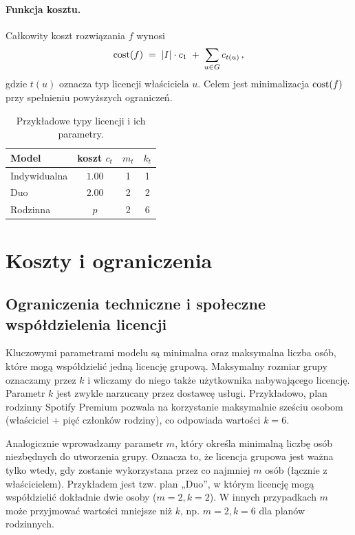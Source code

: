 \paragraph{Funkcja kosztu.}
Całkowity koszt rozwiązania $f$ wynosi
\[
  \operatorname{cost}(f)\;=\;|I|\cdot c_1\; +\; \sum_{u\in G} c_{t(u)}\, ,
\]
gdzie $t(u)$ oznacza typ licencji właściciela $u$. Celem jest minimalizacja $\operatorname{cost}(f)$ przy spełnieniu powyższych ograniczeń.

\begin{table}[h]
\centering
\begin{tabular}{@{}lccc@{}}
\toprule
Model & koszt $c_t$ & $m_t$ & $k_t$ \\
\midrule
Indywidualna & $1.00$ & 1 & 1 \\
Duo          & $2.00$ & 2 & 2 \\
Rodzinna     & $p$    & 2 & 6 \\
\bottomrule
\end{tabular}
\caption{Przykładowe typy licencji i ich parametry.}
\label{tab:license_models}
\end{table}


\section{Koszty i ograniczenia}

\subsection{Ograniczenia techniczne i społeczne współdzielenia licencji}

Kluczowymi parametrami modelu są minimalna oraz maksymalna liczba osób, które mogą współdzielić jedną licencję grupową. Maksymalny rozmiar grupy oznaczamy przez $k$ i wliczamy do niego także użytkownika nabywającego licencję. Parametr $k$ jest zwykle narzucany przez dostawcę usługi. Przykładowo, plan rodzinny Spotify Premium pozwala na korzystanie maksymalnie sześciu osobom (właściciel + pięć członków rodziny), co odpowiada wartości $k=6$.

Analogicznie wprowadzamy parametr $m$, który określa minimalną liczbę osób niezbędnych do utworzenia grupy. Oznacza to, że licencja grupowa jest ważna tylko wtedy, gdy zostanie wykorzystana przez co najmniej $m$ osób (łącznie z właścicielem). Przykładem jest tzw. plan „Duo”, w którym licencję mogą współdzielić dokładnie dwie osoby ($m=2, k=2$). W innych przypadkach $m$ może przyjmować wartości mniejsze niż $k$, np. $m=2, k=6$ dla planów rodzinnych.

